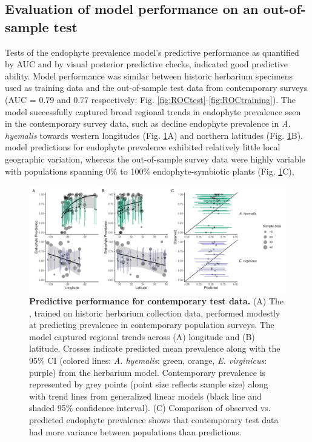 \documentclass[11pt]{article}
\newcommand{\revise}[1]{{\color{black}{#1}}}
\begin{document}
\subsection*{Evaluation of model performance on an out-of-sample test}
Tests of the endophyte prevalence model's predictive performance as quantified by AUC and by visual posterior predictive checks, indicated good predictive ability. 
Model performance was similar between historic herbarium specimens used as training data and the out-of-sample test data from contemporary surveys (AUC = 0.79 and 0.77 respectively; Fig. \ref{fig:ROCtest}-\ref{fig:ROCtraining}).  
The model successfully captured broad regional trends in endophyte prevalence seen in the contemporary survey data, such as decline endophyte prevalence in \emph{A. hyemalis} towards western longitudes (Fig. \ref{fig:contemptestplot}A) and \revise{an increase towards} northern latitudes (Fig. \ref{fig:contemptestplot}B). 
\revise{It is noteable that} model predictions for endophyte prevalence exhibited relatively little local geographic variation, whereas the out-of-sample survey data were highly variable with populations spanning 0\% to 100\% endophyte-symbiotic plants (Fig. \ref{fig:contemptestplot}C), \revise{indicating population-to-population variation not captured in the endophyte prevalence model.}



\begin{figure}[H]
	\centering
	\includegraphics[width = \linewidth]{../Plots/contemp_test_plot.png}
	\caption[Predictive performance for contemporary test data.]{\textbf{Predictive performance for contemporary test data.} (A)
		 The \revise{endophyte prevalence model}, trained on historic herbarium collection data, performed modestly at predicting prevalence in contemporary population surveys. The model captured regional trends across (A) longitude and (B) latitude. Crosses indicate predicted mean prevalence along with the 95\% CI (colored lines: \emph{A. hyemalis}: green, orange, \emph{E. virginicus}: purple) from the herbarium model. Contemporary prevalence is represented by grey points (point size reflects sample size) along with trend lines from generalized linear models (black line and shaded 95\% confidence interval). (C) Comparison of \revise{contemporary} observed \revise{population prevalence} vs. predicted endophyte prevalence shows that contemporary test data had more variance between populations than \revise{in model} predictions.}
	\label{fig:contemptestplot}
\end{figure}
\end{document}
